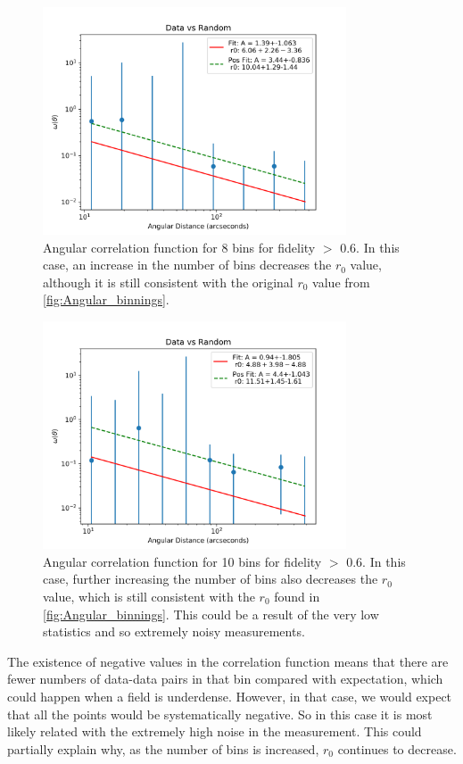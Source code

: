 \begin{figure}[!htbp]
\centering \includegraphics[width=90mm]{clustering_two/Data_vs_Random_20000_bin8_sn0_6_NFalse.png}
\caption{Angular correlation function for 8 bins  for fidelity $>$ 0.6. In this case, an increase in the number of bins decreases the $r_0$ value, although it is still consistent with the original $r_0$ value from \ref{fig:Angular_binnings}.}
\label{fig:Angular_bin_8}
\end{figure}

\begin{figure}[!htbp]
\centering \includegraphics[width=90mm]{FINAL_Data_vs_Random_20000_bin10_sn0_6_NFalse.png}
\caption{Angular correlation function for 10 bins for fidelity $>$ 0.6. In this case, further increasing the number of bins also decreases the $r_0$ value, which is still consistent with the $r_0$ found in \ref{fig:Angular_binnings}. This could be a result of the very low statistics and so extremely noisy measurements.}
\label{fig:Angular_bin_5}
\end{figure}

The existence of negative values in the correlation function means that there are fewer numbers of data-data pairs in that bin compared with expectation, which could happen when a field is underdense. However, in that case, we would expect that all the points would be systematically negative. So in this case it is most likely related with the extremely high noise in the measurement. This could partially explain why, as the number of bins is increased, $r_0$ continues to decrease. 


